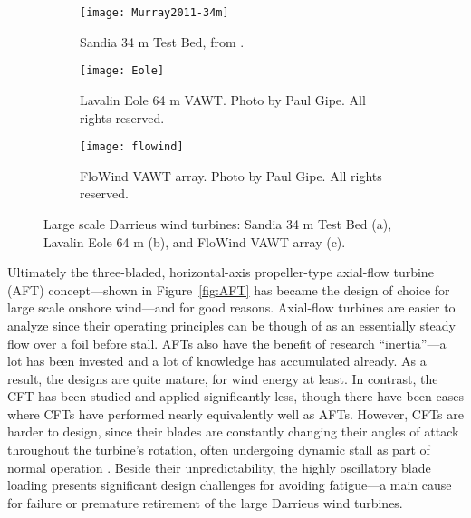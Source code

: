 \begin{figure}
    \centering

    \begin{subfigure}[b]{0.595\textwidth}
        \centering
        
        \texttt{[image: Murray2011-34m]}
        
        \caption{Sandia 34 m Test Bed, from \cite{Murray2011}.}
        
        \label{fig:Sandia-34m}
    \end{subfigure}
    \hfill
    \begin{subfigure}[b]{0.355\textwidth}
        \centering
        
        \texttt{[image: Eole]}
        
        \caption{Lavalin Eole 64 m VAWT. Photo by Paul Gipe. All rights
            reserved.}
        
        \label{fig:Eole}
    \end{subfigure}
    
    \begin{subfigure}[b]{0.8\textwidth}
        \centering
        
        \texttt{[image: flowind]}
        
        \caption{FloWind VAWT array. Photo by Paul Gipe. All rights reserved.}
        
        \label{fig:FloWind}
    \end{subfigure}
    
    \caption{Large scale Darrieus wind turbines: Sandia 34 m Test Bed (a),
        Lavalin Eole 64 m (b), and FloWind VAWT array (c).}
    
    \label{fig:Darrieus}
\end{figure}

Ultimately the three-bladed, horizontal-axis propeller-type axial-flow turbine
(AFT) concept---shown in Figure~\ref{fig:AFT} has became the design of choice
for large scale onshore wind---and for good reasons. Axial-flow turbines are
easier to analyze since their operating principles can be though of as an
essentially steady flow over a foil before stall. AFTs also have the benefit of
research ``inertia''---a lot has been invested and a lot of knowledge has
accumulated already. As a result, the designs are quite mature, for wind energy
at least. In contrast, the CFT has been studied and applied significantly less,
though there have been cases where CFTs have performed nearly equivalently well
as AFTs. However, CFTs are harder to design, since their blades are constantly
changing their angles of attack throughout the turbine's rotation, often
undergoing dynamic stall as part of normal operation \cite{Para2002}. Beside
their unpredictability, the highly oscillatory blade loading presents
significant design challenges for avoiding fatigue---a main cause for failure or
premature retirement of the large Darrieus wind turbines.


